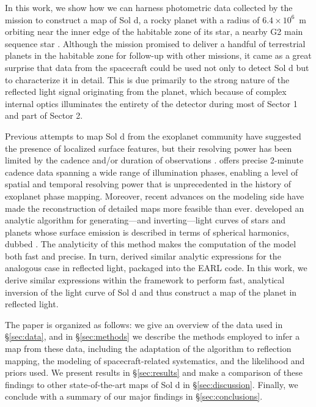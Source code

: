 \documentclass[modern]{aastex62}
\begin{document}
In this work, we show how we can harness photometric data collected by the \TESS mission
to construct a map of Sol d, a rocky planet ‎with a radius of $6.4\times 10^6$~m
orbiting near the inner edge of the habitable zone of its star, a nearby G2 main sequence
star \citep{Sagan1993}. Although the \TESS mission promised to deliver a handful of terrestrial planets in 
the habitable zone for follow-up with other missions, it came as a great surprise
that data from the spacecraft could be used not only to detect Sol d but to
characterize it in detail. This is due primarily to the strong nature of the reflected
light signal originating from the planet, which 
because of complex internal optics illuminates the entirety of the \TESS detector 
during most of Sector 1 and part of Sector 2.

Previous attempts to map Sol d from the exoplanet community have suggested 
the presence of localized surface features, but their resolving power has been 
limited by the cadence and/or duration of observations \citep{Cowan2009,Jiang2018}. 
\TESS offers precise 2-minute cadence data spanning a wide range of illumination 
phases, enabling a level of spatial and temporal resolving power that is 
unprecedented in the history of exoplanet phase mapping. 
%
Moreover, recent advances on the modeling side 
have made the reconstruction of detailed maps more feasible than ever. 
\cite{Luger2019} developed an analytic algorithm for generating---and
inverting---light curves of stars and planets whose surface emission is
described in terms of spherical harmonics, dubbed \starry. The analyticity of this
method makes the computation of the model both fast and precise.
In turn, \cite{Haggard2018} derived similar analytic expressions for the
analogous case in reflected light, packaged into the 
\textsf{EARL} code. In this work, we derive similar expressions within
the \starry framework to perform fast, analytical inversion of the light curve
of Sol d and thus construct a map of the planet in reflected light.

The paper is organized as follows: we give an overview of the \TESS data used in \S\ref{sec:data},
and in \S\ref{sec:methods} we describe the methods employed to infer a map 
from these data, including the adaptation of the \starry algorithm to reflection 
mapping, the modeling of spacecraft-related systematics, and the likelihood and 
priors used. 
We present results in \S\ref{sec:results} and make a comparison of these 
findings to other state-of-the-art maps of Sol d in 
\S\ref{sec:discussion}. 
Finally, we conclude with a summary of our major findings in \S\ref{sec:conclusions}.
\end{document}
